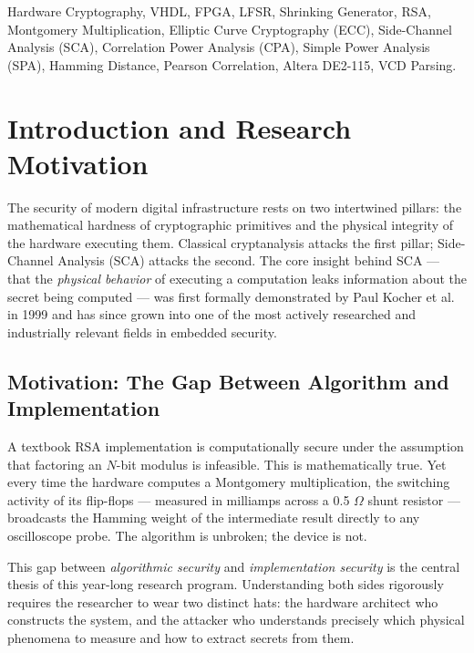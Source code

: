 \documentclass[conference, a4paper]{IEEEtran}
\begin{document}
\begin{IEEEkeywords}
Hardware Cryptography, VHDL, FPGA, LFSR, Shrinking Generator, RSA, Montgomery Multiplication, Elliptic Curve Cryptography (ECC), Side-Channel Analysis (SCA), Correlation Power Analysis (CPA), Simple Power Analysis (SPA), Hamming Distance, Pearson Correlation, Altera DE2-115, VCD Parsing.
\end{IEEEkeywords}

\section{Introduction and Research Motivation}

The security of modern digital infrastructure rests on two intertwined pillars: the mathematical hardness of cryptographic primitives and the physical integrity of the hardware executing them. Classical cryptanalysis attacks the first pillar; Side-Channel Analysis (SCA) attacks the second. The core insight behind SCA — that the \textit{physical behavior} of executing a computation leaks information about the secret being computed — was first formally demonstrated by Paul Kocher et al. in 1999 \cite{b3} and has since grown into one of the most actively researched and industrially relevant fields in embedded security.

\subsection{Motivation: The Gap Between Algorithm and Implementation}
A textbook RSA implementation is computationally secure under the assumption that factoring an $N$-bit modulus is infeasible. This is mathematically true. Yet every time the hardware computes a Montgomery multiplication, the switching activity of its flip-flops — measured in milliamps across a 0.5 $\Omega$ shunt resistor — broadcasts the Hamming weight of the intermediate result directly to any oscilloscope probe. The algorithm is unbroken; the device is not.

This gap between \textit{algorithmic security} and \textit{implementation security} is the central thesis of this year-long research program. Understanding both sides rigorously requires the researcher to wear two distinct hats: the hardware architect who constructs the system, and the attacker who understands precisely which physical phenomena to measure and how to extract secrets from them.
\end{document}
